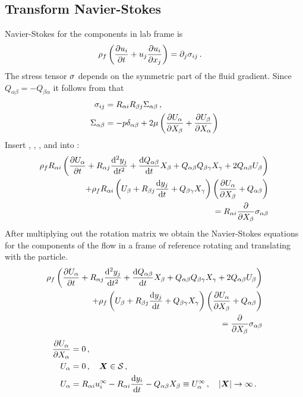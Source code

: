 \documentclass[thesis.tex]{subfiles}
\begin{document}
\subsection{Transform Navier-Stokes}
Navier-Stokes for the components in lab frame is
\begin{align}
    \rho_f\left(\pdiff{u_i}{t} + u_j\pdiff{u_i}{x_j}\right) &= \partial_j \sigma_{ij}\,.\eqnlab{nslab}
\end{align}
The stress tensor $\mathbb{\sigma}$ depends on the symmetric part of the fluid gradient. Since $Q_{\alpha \beta}=-Q_{\beta \alpha}$ it follows from  that
\begin{align}
	\sigma_{ij} &= R_{\alpha i}R_{\beta j}\Sigma_{\alpha \beta}\,,\nn\\
	\Sigma_{\alpha \beta} &= -p \delta_{\alpha \beta} + 2\mu \left(\pdiff{U_\alpha}{X_\beta}+\pdiff{U_\beta}{X_\alpha}\right)\eqnlab{sigma_particle}
\end{align}
Insert , , , and  into :
\begin{align}
	\rho_f R_{\alpha i}\left(\frac{\partial U_\alpha}{\partial t} + R_{\alpha j}\frac{\mathrm{d}^2y_j}{\mathrm{d} t^2} + \frac{\mathrm{d} Q_{\alpha \beta}}{\mathrm{d} t}X_\beta + Q_{\alpha \beta}Q_{\beta \gamma}X_\gamma + 2Q_{\alpha \beta}U_\beta \right) \nonumber \\
	+ \rho_f R_{\alpha i}\left(U_\beta + R_{\beta j}\frac{\mathrm{d} y_j}{\mathrm{d} t}+Q_{\beta \gamma}X_\gamma\right)\left(\frac{\partial U_\alpha}{\partial X_\beta}+Q_{\alpha \beta}\right) \nonumber \\
	= R_{\alpha i}\frac{\partial }{\partial X_\beta} \sigma_{\alpha \beta}
\end{align}
After multiplying out the rotation matrix we obtain the Navier-Stokes equations for the components of the flow in a frame of reference rotating and translating with the particle.
\begin{align}
	\rho_f \left(\pdiff{U_\alpha}{t} + R_{\alpha j}\frac{\rd^2y_j}{\rd t^2} + \diff{Q_{\alpha \beta}}{t}X_\beta + Q_{\alpha \beta}Q_{\beta \gamma}X_\gamma + 2Q_{\alpha \beta}U_\beta \right) \nn \\
	+ \rho_f \left(U_\beta + R_{\beta j}\diff{y_j}{t}+Q_{\beta \gamma}X_\gamma\right)\left(\pdiff{U_\alpha}{X_\beta}+Q_{\alpha \beta}\right) \nn \\
	= \pdiff{}{X_\beta} \sigma_{\alpha \beta}\eqnlab{nspar}
\end{align}
\begin{align}
	\frac{\partial U_\alpha}{\partial X_\alpha} &= 0\,, \\
	U_\alpha &= 0\,,\quad \mbox{\boldmath$X$} \in \mathcal S\,, \\
	U_\alpha &= R_{\alpha i}u^\infty_i - R_{\alpha i}\frac{\mathrm{d} y_i}{\mathrm{d} t} - Q_{\alpha \beta} X_\beta \equiv U^\infty_\alpha \,,\quad|\mbox{\boldmath$X$}|\to\infty\,.
\end{align}
\end{document}
